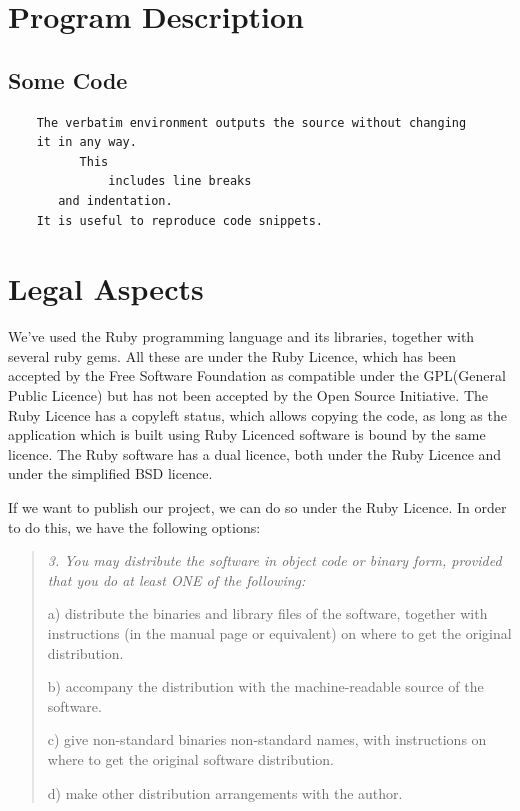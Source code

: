 \documentclass[a4wide, 11pt]{article}
\newenvironment{italicquotes}
{\begin{quote}\itshape\small}
{\end{quote}}
\begin{document}
\clearpage

\section{Program Description}
\subsection{Some Code} 

\begin{verbatim}
    The verbatim environment outputs the source without changing
    it in any way. 
          This
              includes line breaks
       and indentation. 
    It is useful to reproduce code snippets.
\end{verbatim}
\clearpage

\section{Legal Aspects}

We've used the Ruby programming language and its libraries, together with
several ruby gems. All these are under the Ruby Licence, which has been
accepted by the Free Software Foundation as compatible under the GPL(General
Public Licence)\cite{GNUlicence} but has not been accepted by the Open Source
Initiative. The Ruby Licence has a copyleft status, which allows copying the
code, as long as the application which is built using Ruby Licenced software is
bound by the same licence. The Ruby software has a dual licence, both under the
Ruby Licence and under the simplified BSD licence.

If we want to publish our project, we can do so under the Ruby Licence.
In order to do this, we have the following options:

\begin{italicquotes}
3. You may distribute the software in object code or binary form,
   provided that you do at least ONE of the following:

a) distribute the binaries and library files of the software,
together with instructions (in the manual page or equivalent)
on where to get the original distribution.

b) accompany the distribution with the machine-readable source of
the software.

c) give non-standard binaries non-standard names, with
instructions on where to get the original software distribution.

d) make other distribution arrangements with the author.
     \cite{Rubylicence}
\end{italicquotes}
\end{document}
